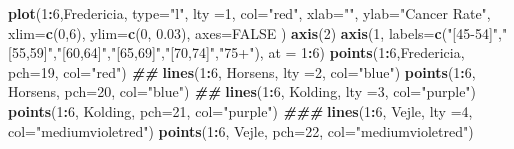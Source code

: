 \documentclass[
]{book}
\newenvironment{Shaded}{\begin{snugshade}}{\end{snugshade}}
\newcommand{\AttributeTok}[1]{\textcolor[rgb]{0.13,0.29,0.53}{#1}}
\newcommand{\ConstantTok}[1]{\textcolor[rgb]{0.56,0.35,0.01}{#1}}
\newcommand{\DecValTok}[1]{\textcolor[rgb]{0.00,0.00,0.81}{#1}}
\newcommand{\DocumentationTok}[1]{\textcolor[rgb]{0.56,0.35,0.01}{\textbf{\textit{#1}}}}
\newcommand{\FloatTok}[1]{\textcolor[rgb]{0.00,0.00,0.81}{#1}}
\newcommand{\FunctionTok}[1]{\textcolor[rgb]{0.13,0.29,0.53}{\textbf{#1}}}
\newcommand{\NormalTok}[1]{#1}
\newcommand{\SpecialCharTok}[1]{\textcolor[rgb]{0.81,0.36,0.00}{\textbf{#1}}}
\newcommand{\StringTok}[1]{\textcolor[rgb]{0.31,0.60,0.02}{#1}}
\begin{document}
\begin{Shaded}
\begin{Highlighting}[]
\FunctionTok{plot}\NormalTok{(}\DecValTok{1}\SpecialCharTok{:}\DecValTok{6}\NormalTok{,Fredericia, }\AttributeTok{type=}\StringTok{"l"}\NormalTok{, }\AttributeTok{lty =}\DecValTok{1}\NormalTok{, }\AttributeTok{col=}\StringTok{"red"}\NormalTok{, }\AttributeTok{xlab=}\StringTok{""}\NormalTok{, }
               \AttributeTok{ylab=}\StringTok{"Cancer Rate"}\NormalTok{, }\AttributeTok{xlim=}\FunctionTok{c}\NormalTok{(}\DecValTok{0}\NormalTok{,}\DecValTok{6}\NormalTok{), }\AttributeTok{ylim=}\FunctionTok{c}\NormalTok{(}\DecValTok{0}\NormalTok{, }\FloatTok{0.03}\NormalTok{), }\AttributeTok{axes=}\ConstantTok{FALSE}\NormalTok{ )}
\FunctionTok{axis}\NormalTok{(}\DecValTok{2}\NormalTok{)}
\FunctionTok{axis}\NormalTok{(}\DecValTok{1}\NormalTok{, }\AttributeTok{labels=}\FunctionTok{c}\NormalTok{(}\StringTok{"[45{-}54]"}\NormalTok{,}\StringTok{"[55,59]"}\NormalTok{,}\StringTok{"[60,64]"}\NormalTok{,}\StringTok{"[65,69]"}\NormalTok{,}\StringTok{"[70,74]"}\NormalTok{,}\StringTok{"75+"}\NormalTok{), }
            \AttributeTok{at =} \DecValTok{1}\SpecialCharTok{:}\DecValTok{6}\NormalTok{)}
\FunctionTok{points}\NormalTok{(}\DecValTok{1}\SpecialCharTok{:}\DecValTok{6}\NormalTok{,Fredericia, }\AttributeTok{pch=}\DecValTok{19}\NormalTok{, }\AttributeTok{col=}\StringTok{"red"}\NormalTok{)}
\DocumentationTok{\#\#}
\FunctionTok{lines}\NormalTok{(}\DecValTok{1}\SpecialCharTok{:}\DecValTok{6}\NormalTok{, Horsens, }\AttributeTok{lty =}\DecValTok{2}\NormalTok{, }\AttributeTok{col=}\StringTok{"blue"}\NormalTok{)}
\FunctionTok{points}\NormalTok{(}\DecValTok{1}\SpecialCharTok{:}\DecValTok{6}\NormalTok{, Horsens, }\AttributeTok{pch=}\DecValTok{20}\NormalTok{, }\AttributeTok{col=}\StringTok{"blue"}\NormalTok{)}
\DocumentationTok{\#\#}
\FunctionTok{lines}\NormalTok{(}\DecValTok{1}\SpecialCharTok{:}\DecValTok{6}\NormalTok{, Kolding, }\AttributeTok{lty =}\DecValTok{3}\NormalTok{, }\AttributeTok{col=}\StringTok{"purple"}\NormalTok{)}
\FunctionTok{points}\NormalTok{(}\DecValTok{1}\SpecialCharTok{:}\DecValTok{6}\NormalTok{, Kolding, }\AttributeTok{pch=}\DecValTok{21}\NormalTok{, }\AttributeTok{col=}\StringTok{"purple"}\NormalTok{)}
\DocumentationTok{\#\#\#}
\FunctionTok{lines}\NormalTok{(}\DecValTok{1}\SpecialCharTok{:}\DecValTok{6}\NormalTok{, Vejle, }\AttributeTok{lty =}\DecValTok{4}\NormalTok{, }\AttributeTok{col=}\StringTok{"mediumvioletred"}\NormalTok{)}
\FunctionTok{points}\NormalTok{(}\DecValTok{1}\SpecialCharTok{:}\DecValTok{6}\NormalTok{, Vejle, }\AttributeTok{pch=}\DecValTok{22}\NormalTok{, }\AttributeTok{col=}\StringTok{"mediumvioletred"}\NormalTok{)}

\end{Highlighting}
\end{Shaded}
\end{document}
